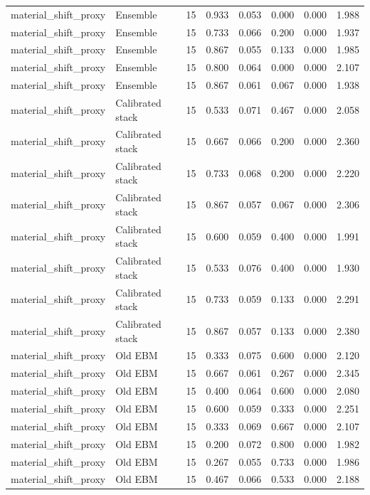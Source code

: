 {\begin{longtable}{llrrrrrr}
material\_shift\_proxy & Ensemble & 15 & 0.933 & 0.053 & 0.000 & 0.000 & 1.988 \\
material\_shift\_proxy & Ensemble & 15 & 0.733 & 0.066 & 0.200 & 0.000 & 1.937 \\
material\_shift\_proxy & Ensemble & 15 & 0.867 & 0.055 & 0.133 & 0.000 & 1.985 \\
material\_shift\_proxy & Ensemble & 15 & 0.800 & 0.064 & 0.000 & 0.000 & 2.107 \\
material\_shift\_proxy & Ensemble & 15 & 0.867 & 0.061 & 0.067 & 0.000 & 1.938 \\
material\_shift\_proxy & Calibrated stack & 15 & 0.533 & 0.071 & 0.467 & 0.000 & 2.058 \\
material\_shift\_proxy & Calibrated stack & 15 & 0.667 & 0.066 & 0.200 & 0.000 & 2.360 \\
material\_shift\_proxy & Calibrated stack & 15 & 0.733 & 0.068 & 0.200 & 0.000 & 2.220 \\
material\_shift\_proxy & Calibrated stack & 15 & 0.867 & 0.057 & 0.067 & 0.000 & 2.306 \\
material\_shift\_proxy & Calibrated stack & 15 & 0.600 & 0.059 & 0.400 & 0.000 & 1.991 \\
material\_shift\_proxy & Calibrated stack & 15 & 0.533 & 0.076 & 0.400 & 0.000 & 1.930 \\
material\_shift\_proxy & Calibrated stack & 15 & 0.733 & 0.059 & 0.133 & 0.000 & 2.291 \\
material\_shift\_proxy & Calibrated stack & 15 & 0.867 & 0.057 & 0.133 & 0.000 & 2.380 \\
material\_shift\_proxy & Old EBM & 15 & 0.333 & 0.075 & 0.600 & 0.000 & 2.120 \\
material\_shift\_proxy & Old EBM & 15 & 0.667 & 0.061 & 0.267 & 0.000 & 2.345 \\
material\_shift\_proxy & Old EBM & 15 & 0.400 & 0.064 & 0.600 & 0.000 & 2.080 \\
material\_shift\_proxy & Old EBM & 15 & 0.600 & 0.059 & 0.333 & 0.000 & 2.251 \\
material\_shift\_proxy & Old EBM & 15 & 0.333 & 0.069 & 0.667 & 0.000 & 2.107 \\
material\_shift\_proxy & Old EBM & 15 & 0.200 & 0.072 & 0.800 & 0.000 & 1.982 \\
material\_shift\_proxy & Old EBM & 15 & 0.267 & 0.055 & 0.733 & 0.000 & 1.986 \\
material\_shift\_proxy & Old EBM & 15 & 0.467 & 0.066 & 0.533 & 0.000 & 2.188 \\

\end{longtable}}
